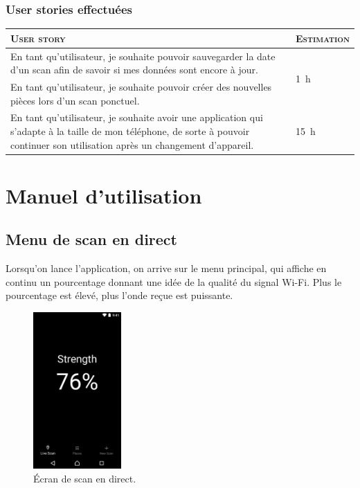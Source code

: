 \documentclass{elsarticle}
\newcommand{\est}[1]{\multirow{2}{*}{\SI{#1}{\hour}}}
\newcommand{\estbis}[1]{\SI{#1}{\hour}}
\begin{document}
\subsubsection{User stories effectuées}
\begin{table}[H]
\centering
\begin{tabular}{p{14cm}m{2cm}}
	\toprule
	\textsc{User story} & \textsc{Estimation}\\
	\midrule
	En tant qu'utilisateur, je souhaite pouvoir sauvegarder la date d'un scan afin de savoir si mes données sont encore à jour. & \est{1}\\
	\midrule
	En tant qu'utilisateur, je souhaite pouvoir créer des nouvelles pièces lors d'un scan ponctuel. & \estbis{7}\\
	\midrule
	En tant qu'utilisateur, je souhaite avoir une application qui s'adapte à la taille de mon téléphone, de sorte à pouvoir continuer son utilisation après un changement d'appareil. & \est{15}\\
	\bottomrule
\end{tabular}
\end{table}

\section{Manuel d'utilisation}
\subsection{Menu de scan en direct}
Lorsqu'on lance l'application, on arrive sur le menu principal, qui affiche en continu un pourcentage donnant une idée de la qualité du signal Wi-Fi.
Plus le pourcentage est élevé, plus l'onde reçue est puissante.

\begin{figure}[!htbp]
	\centering
	\includegraphics[width=0.3\textwidth]{img/livescan}
	\caption{Écran de scan en direct.}
	\label{fig:livescan}
\end{figure}
\end{document}
